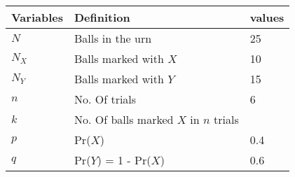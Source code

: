	\begin{table}[htp]
		\begin{tabular}{|l|l|l|}\hline
			Variables	&Definition &values\\ \hline
			$N$ &Balls in the urn & 25\\ \hline
			$N_X$ &Balls marked with $X$ & 10\\ \hline
			$N_Y$ &Balls marked with $Y$ & 15\\ \hline
			$n$	&No. Of trials & 6\\ \hline
			$k$	&No. Of balls marked $X$ in $n$ trials & \\ \hline
			$p$	&Pr($X$) & 0.4\\ \hline
			$q$	&Pr($Y$) = 1 - Pr($X$) & 0.6\\	\hline
			
		\end{tabular}
	\end{table}
